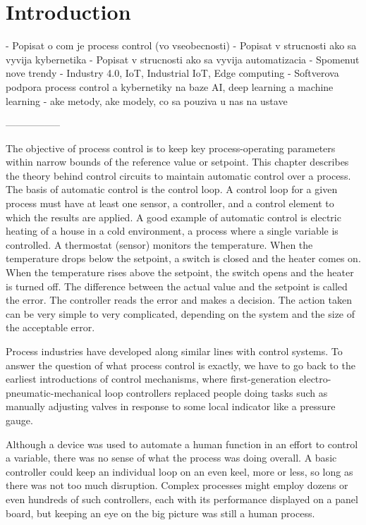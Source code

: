 \setcounter{page}{1}
\setcounter{equation}{0}
\setcounter{figure}{0}
\setcounter{table}{0}

\section*{Introduction}

- Popisat o com je process control (vo vseobecnosti)
- Popisat v strucnosti ako sa vyvija kybernetika
- Popisat v strucnosti ako sa vyvija automatizacia
- Spomenut nove trendy - Industry 4.0, IoT, Industrial IoT, Edge computing
- Softverova podpora process control a kybernetiky na baze AI, deep learning a machine learning - ake metody, ake modely, co sa pouziva u nas na ustave

-----------------

The objective of process control is to keep key process-operating parameters within narrow bounds of the reference value or setpoint. This chapter describes the theory behind control circuits to maintain automatic control over a process. The basis of automatic control is the control loop. A control loop for a given process must have at least one sensor, a controller, and a control element to which the results are applied. A good example of automatic control is electric heating of a house in a cold environment, a process where a single variable is controlled. A thermostat (sensor) monitors the temperature. When the temperature drops below the setpoint, a switch is closed and the heater comes on. When the temperature rises above the setpoint, the switch opens and the heater is turned off. The difference between the actual value and the setpoint is called the error. The controller reads the error and makes a decision. The action taken can be very simple to very complicated, depending on the system and the size of the acceptable error.

Process industries have developed along similar lines with control systems. To answer the question of what process control is exactly, we have to go back to the earliest introductions of control mechanisms, where first-generation electro-pneumatic-mechanical loop controllers replaced people doing tasks such as manually adjusting valves in response to some local indicator like a pressure gauge.



Although a device was used to automate a human function in an effort to control a variable, there was no sense of what the process was doing overall. A basic controller could keep an individual loop on an even keel, more or less, so long as there was not too much disruption. Complex processes might employ dozens or even hundreds of such controllers, each with its performance displayed on a panel board, but keeping an eye on the big picture was still a human process.


